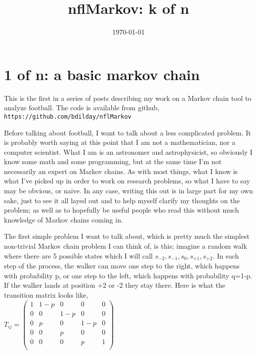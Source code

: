 \documentclass{article}
\begin{document}
\setlength{\parskip}{0.08cm}

\title{nflMarkov: k of n}

\date{\today}

\maketitle

\tableofcontents

\newpage
\setcounter{footnote}{0}

\section{1 of n: a basic markov chain}


This is the first in a series of posts describing my work on a Markov chain tool to analyze football. The code is available from github,
{\tt https://github.com/bdilday/nflMarkov}

Before talking about football, I want to talk about a less complicated problem. It is probably worth saying at this point that I am not a mathematician, nor a computer scientist. What I am is an astronomer and astrophysicist, so obviously I know some math and some programming, but at the same time I'm not necessarily an expert on Markov chains. As with most things, what I know is what I've picked up in order to work on research problems, so what I have to say may be obvious, or naive. In any case, writing this out is in large part for my own sake, just to see it all layed out and to help myself clarify my thoughts on the problem; as well as to hopefully be useful people who read this without much knowledge of Markov chains coming in. 

The first simple problem I want to talk about, which is pretty much the simplest non-trivial Markov chain problem I can think of, is this; imagine a random walk where there are 5 possible states which I will call $s_{-2}, s_{-1}, s_{0}, s_{+1}, s_{+2}$. In each step of the process, the walker can move one step to the right, which happens with probability p, or one step to the left, which happens with probability q=1-p. If the walker lands at position +2 or -2 they stay there. Here is what the transition matrix looks like, \\


$
T_{ij} = \left(
\begin{array}{ccccc}
 1 & 1-p & 0 & 0 & 0 \\
 0 & 0 & 1-p & 0 & 0 \\
 0 & p & 0 & 1-p & 0 \\
 0 & 0 & p & 0 & 0 \\
 0 & 0 & 0 & p & 1 \\
\end{array}
\right)$ \\
\end{document}
